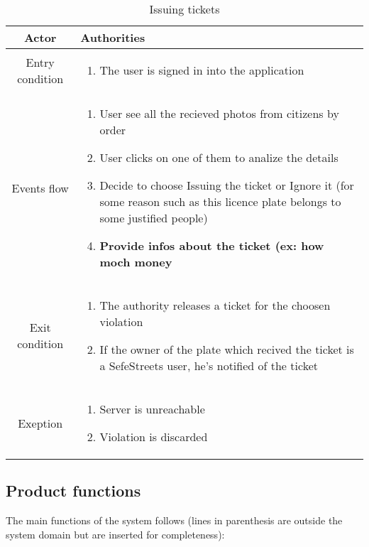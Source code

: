 \documentclass{article}
\begin{document}
		\begin{table} [H]
		\begin{center}
		\caption{Issuing tickets}
		\begin{tabular}{|c|p{8cm}|}
			\hline
			Actor&Authorities\\
			\hline
			Entry condition& \begin{enumerate}
								\item The user is signed in into the application
							\end{enumerate}\\
			\hline
			 Events flow& \begin{enumerate}
							\item User see all the recieved photos from citizens by order
							\item User clicks on one of them to analize the details
							\item Decide to choose Issuing the ticket or Ignore it (for some reason such as this licence plate belongs to some justified people)
							\item \textbf{Provide infos about the ticket (ex: how moch money}
						\end{enumerate}\\
			\hline
			Exit condition& \begin{enumerate}
								\item The authority releases a ticket for the choosen violation
								\item If the owner of the plate which recived the ticket is a SefeStreets user, he's notified of the ticket
							\end{enumerate}\\
			\hline
			Exeption& \begin{enumerate}
						\item Server is unreachable
						\item Violation is discarded
					\end{enumerate}\\
			\hline
		\end{tabular}
		\end{center}
		\end{table} 
	\newpage
	\subsection{Product functions}
	The main functions of the system follows (lines in parenthesis are outside the system domain but are inserted for completeness):
\end{document}
